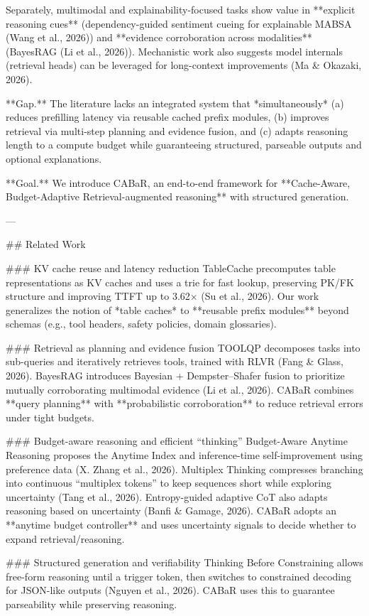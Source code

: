 Separately, multimodal and explainability-focused tasks show value in **explicit reasoning cues** (dependency-guided sentiment cueing for explainable MABSA (Wang et al., 2026)) and **evidence corroboration across modalities** (BayesRAG (Li et al., 2026)). Mechanistic work also suggests model internals (retrieval heads) can be leveraged for long-context improvements (Ma & Okazaki, 2026).  

**Gap.** The literature lacks an integrated system that *simultaneously* (a) reduces prefilling latency via reusable cached prefix modules, (b) improves retrieval via multi-step planning and evidence fusion, and (c) adapts reasoning length to a compute budget while guaranteeing structured, parseable outputs and optional explanations.

**Goal.** We introduce CABaR, an end-to-end framework for **Cache-Aware, Budget-Adaptive Retrieval-augmented reasoning** with structured generation.

---

## Related Work  

### KV cache reuse and latency reduction  
TableCache precomputes table representations as KV caches and uses a trie for fast lookup, preserving PK/FK structure and improving TTFT up to 3.62× (Su et al., 2026). Our work generalizes the notion of *table caches* to **reusable prefix modules** beyond schemas (e.g., tool headers, safety policies, domain glossaries).

### Retrieval as planning and evidence fusion  
TOOLQP decomposes tasks into sub-queries and iteratively retrieves tools, trained with RLVR (Fang & Glass, 2026). BayesRAG introduces Bayesian + Dempster–Shafer fusion to prioritize mutually corroborating multimodal evidence (Li et al., 2026). CABaR combines **query planning** with **probabilistic corroboration** to reduce retrieval errors under tight budgets.

### Budget-aware reasoning and efficient “thinking”  
Budget-Aware Anytime Reasoning proposes the Anytime Index and inference-time self-improvement using preference data (X. Zhang et al., 2026). Multiplex Thinking compresses branching into continuous “multiplex tokens” to keep sequences short while exploring uncertainty (Tang et al., 2026). Entropy-guided adaptive CoT also adapts reasoning based on uncertainty (Banfi & Gamage, 2026). CABaR adopts an **anytime budget controller** and uses uncertainty signals to decide whether to expand retrieval/reasoning.

### Structured generation and verifiability  
Thinking Before Constraining allows free-form reasoning until a trigger token, then switches to constrained decoding for JSON-like outputs (Nguyen et al., 2026). CABaR uses this to guarantee parseability while preserving reasoning.

